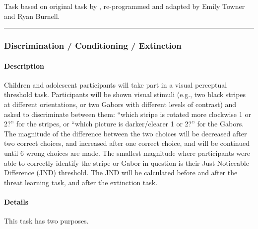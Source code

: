 \documentclass[]{book}
\let\oldparagraph\paragraph
\renewcommand{\paragraph}[1]{\oldparagraph{#1}\mbox{}}
\begin{document}
Task based on original task by \citet{frank_2004}, re-programmed and adapted by Emily Towner and Ryan Burnell.

\begin{center}\rule{0.5\linewidth}{0.5pt}\end{center}

\hypertarget{discrimination-conditioning-extinction}{%
\subsubsection{Discrimination / Conditioning / Extinction}\label{discrimination-conditioning-extinction}}

\hypertarget{description-4}{%
\paragraph{Description}\label{description-4}}

Children and adolescent participants will take part in a visual perceptual threshold task. Participants will be shown visual stimuli (e.g., two black stripes at different orientations, or two Gabors with different levels of contrast) and asked to discriminate between them: ``which stripe is rotated more clockwise 1 or 2?'' for the stripes, or
``which picture is darker/clearer 1 or 2?'' for the Gabors. The magnitude of the difference between the two choices will be decreased after two correct choices, and increased after one correct choice, and will be continued until 6 wrong choices are made. The smallest magnitude where participants were able to correctly identify the stripe or Gabor in question is their Just Noticeable Difference (JND) threshold. The JND will be calculated before and after the threat learning task, and after the extinction task.

\hypertarget{details-4}{%
\paragraph{Details}\label{details-4}}

This task has two purposes.
\end{document}
